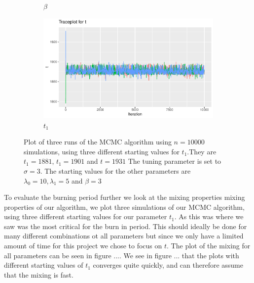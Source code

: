 \begin{figure}[H]
\begin{subfigure}[b]{0.49\textwidth}
        \caption{$\beta$ }
    \end{subfigure}
    \begin{subfigure}[b]{0.49\textwidth}
        \centering
        \includegraphics[width = \textwidth]{Images/mixing_t.pdf}
        \caption{$t_1$}
    \end{subfigure}
    \caption{Plot of three runs of the MCMC algorithm using $n = 10000$ simulations, using three different starting values for $t_1$.They are $t_1 = 1881$, $t_1 = 1901$ and $t = 1931$ The tuning parameter is set to $\sigma = 3$. The starting values for the other parameters are $\lambda_0 = 10, \lambda_1 = 5$ and $\beta = 3$}
    \label{fig:sim_mixing_single}
\end{figure}





To evaluate the burning period further we look at the mixing properties mixing properties of our algorithm, we plot three simulations of our MCMC algorithm, using three different starting values for our parameter $t_1$. As this was where we saw was the most critical for the burn in period. This should ideally be done for many different combinations ot all parameters but since we only have a limited amount of time for this project we chose to focus on $t$. The plot of the mixing for all parameters can be seen in figure .... We see in figure ... that the plots with different starting values of $t_1$ converges quite quickly, and can therefore assume that the mixing is fast. 

